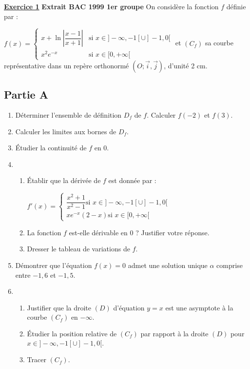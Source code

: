 \documentclass[12pt,a4paper]{article}
\newcommand{\exo}[1]{%
        \textbf{\underline{Exercice #1}}
}
\begin{document}
\begin{multicols}{2}
\setlength{\columnseprule}{0.1mm}

\exo{1} \textbf{Extrait BAC 1999 1er groupe}
On considère la fonction \( f \) définie par :

\( 
f(x) =
\begin{cases}
x + \ln\left|\dfrac{x - 1}{x + 1}\right| & \text{si } x \in ]-\infty, -1[ \cup ]-1, 0[ \\
x^2 e^{-x} & \text{si } x \in [0, +\infty[
\end{cases}
\)
et \( (C_f) \) sa courbe représentative dans un repère orthonormé \( (O; \vec{i}, \vec{j}) \), d’unité 2 cm.

\subsection*{Partie A}
\begin{enumerate}
  \item Déterminer l’ensemble de définition \( D_f \) de \( f \). Calculer \( f(-2) \) et \( f(3) \).
  \item Calculer les limites aux bornes de \( D_f \).
  \item Étudier la continuité de \( f \) en 0.
  \item 
  \begin{enumerate}
    \item Établir que la dérivée de \( f \) est donnée par :
    
\(
    f'(x) =
    \begin{cases}
    \dfrac{x^2 + 1}{x^2 - 1}  \text{si } x \in ]-\infty, -1[ \cup ]-1, 0[ \\
    x e^{-x}(2 - x) \text{si } x \in [0, +\infty[
    \end{cases}
\)
    \item La fonction \( f \) est-elle dérivable en 0 ? Justifier votre réponse.
    \item Dresser le tableau de variations de \( f \).
  \end{enumerate}
  \item Démontrer que l’équation \( f(x) = 0 \) admet une solution unique \( \alpha \) comprise entre \( -1{,}6 \) et \( -1{,}5 \).
  \item 
  \begin{enumerate}
    \item Justifier que la droite \( (D) \) d’équation \( y = x \) est une asymptote à la courbe \( (C_f) \) en \( -\infty \).
    \item Étudier la position relative de \( (C_f) \) par rapport à la droite \( (D) \) pour \( x \in ]-\infty, -1[ \cup ]-1, 0[ \).
    \item Tracer \( (C_f) \).
  \end{enumerate}
\end{enumerate}


\end{multicols}
\end{document}
